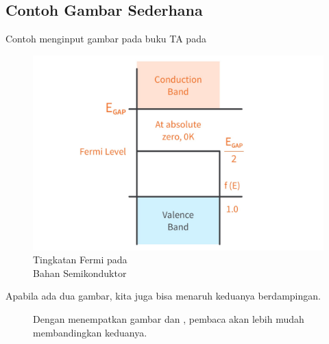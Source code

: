 \subsection{Contoh Gambar Sederhana}
Contoh menginput gambar pada buku TA pada
\begin{figure}[ht] %
    \centering
    \includegraphics[width=0.3\linewidth]{figures/Semiconductor-Fermi-Level-Band-Diagram-1.jpg}
    \caption{Tingkatan Fermi pada\\Bahan Semikonduktor}
    \label{fermilevel}
\end{figure}
Apabila ada dua gambar, kita juga bisa menaruh keduanya berdampingan.

\begin{figure}[H]
    \centering
    \hspace{0.1\linewidth}
    \caption{Dengan menempatkan gambar  dan , pembaca akan lebih mudah membandingkan keduanya.}
    \label{surface}
\end{figure}